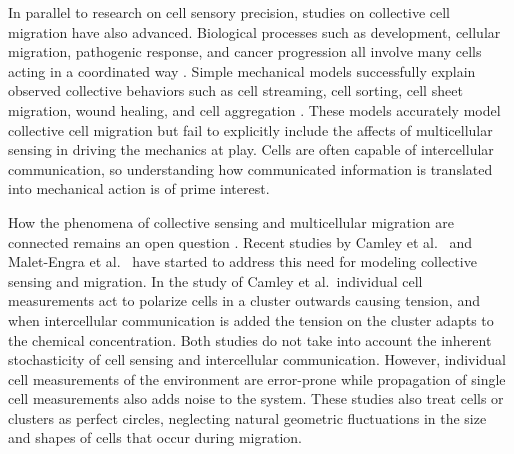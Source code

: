 In parallel to research on cell sensory precision, studies on collective cell  migration have also advanced. Biological processes such as development, cellular migration, pathogenic response, and cancer progression all involve many cells acting in a coordinated way \cite{scarpa2016collective,friedl2010plasticity,rasmussen2006quorum,boelens2014exosome,cheung2013collective,vader2014extracellular,szabo2016modelling}. Simple mechanical models successfully explain observed collective behaviors such as cell streaming, cell sorting, cell sheet migration, wound healing, and cell aggregation \cite{kabla2012collective,szabo2010collective,basan2013alignment,janulevicius2015short}. These models accurately model collective cell migration but fail to explicitly include the affects of multicellular sensing in driving the mechanics at play. Cells are often capable of intercellular communication, so understanding how communicated information is translated into mechanical action is of prime interest.

How the phenomena of collective sensing and multicellular migration are connected remains an open question \cite{varennes2016sense,defranco2008migrating,haeger2015collective}. Recent studies by Camley et al.\ \cite{camley2016emergent} and Malet-Engra et al.\ \cite{malet2015collective} have started to address this need for modeling collective sensing and migration. In the study of Camley et al.\ individual cell measurements act to polarize cells in a cluster outwards causing tension, and when intercellular communication is added the tension on the cluster adapts to the chemical concentration. Both studies do not take into account the inherent stochasticity of cell sensing and intercellular communication. However, individual cell measurements of the environment are error-prone while propagation of single cell measurements also adds noise to the system. These studies also treat cells or clusters as perfect circles, neglecting natural geometric fluctuations in the size and shapes of cells that occur during migration.


